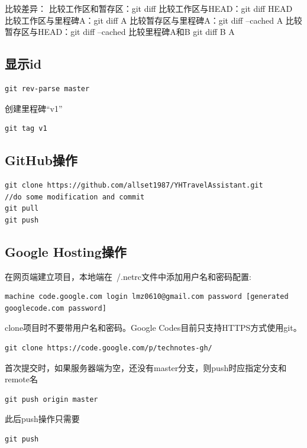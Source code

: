 比较差异：
比较工作区和暂存区：git diff
比较工作区与HEAD：git diff HEAD
比较工作区与里程碑A：git diff A
比较暂存区与里程碑A：git diff --cached A
比较暂存区与HEAD：git diff --cached
比较里程碑A和B git diff B A

\subsection{显示id}
\begin{verbatim}
git rev-parse master
\end{verbatim}

创建里程碑``v1''
\begin{verbatim}
git tag v1
\end{verbatim}

\subsection{GitHub操作}
\begin{verbatim}
git clone https://github.com/allset1987/YHTravelAssistant.git
//do some modification and commit
git pull
git push
\end{verbatim}

\subsection{Google Hosting操作}
在网页端建立项目，本地端在~/.netrc文件中添加用户名和密码配置:
\begin{verbatim}
machine code.google.com login lmz0610@gmail.com password [generated googlecode.com password] 
\end{verbatim}
clone项目时不要带用户名和密码。Google Codes目前只支持HTTPS方式使用git。
\begin{verbatim}
git clone https://code.google.com/p/technotes-gh/
\end{verbatim}
首次提交时，如果服务器端为空，还没有master分支，则push时应指定分支和remote名
\begin{verbatim}
git push origin master 
\end{verbatim}
此后push操作只需要
\begin{verbatim}
git push
\end{verbatim}

